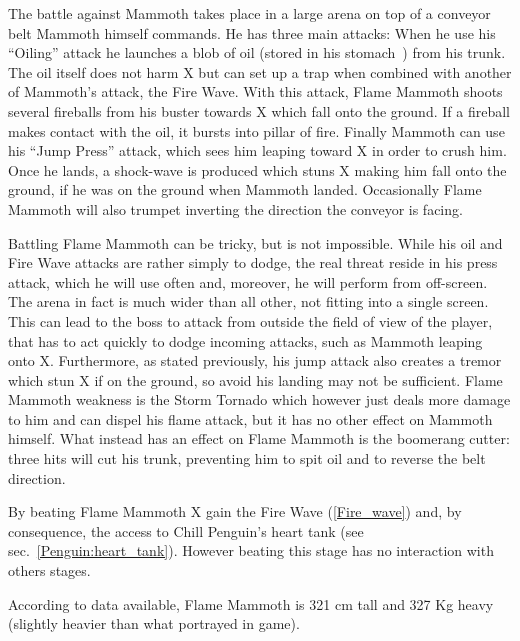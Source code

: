 The battle against Mammoth takes place in a large arena on top of a conveyor belt Mammoth himself commands. He has three main attacks: When he use his ``Oiling'' attack he launches a blob of oil (stored in his stomach~\cite{wayback:X_resources}) from his trunk. 
The oil itself does not harm X but can set up a trap when combined with another of Mammoth's attack, the Fire Wave. With this attack, Flame Mammoth shoots several fireballs from his buster towards X which fall onto the ground. If a fireball makes contact with the oil, it bursts into pillar of fire. Finally Mammoth can use his ``Jump Press'' attack, which sees him leaping toward X in order to crush him. Once he lands, a shock-wave is produced which stuns X making him fall onto the ground, if he was on the ground when Mammoth landed. Occasionally Flame Mammoth will also trumpet inverting the direction the conveyor is facing. 

Battling Flame Mammoth can be tricky, but is not impossible. While his oil and Fire Wave attacks are rather simply to dodge, the real threat reside in his press attack, which he will use often and, moreover, he will perform from off-screen. The arena in fact is much wider than all other, not fitting into a single screen. This can lead to the boss to attack from outside the field of view of the player, that has  to act quickly to dodge incoming attacks, such as Mammoth leaping onto X. Furthermore, as stated previously, his jump attack also creates a tremor which stun X if on the ground, so avoid his landing may not be sufficient. Flame Mammoth weakness is the Storm Tornado which however just deals more damage to him and can dispel his flame attack, but it has no other effect on Mammoth himself. What instead has an effect on Flame Mammoth is the boomerang cutter: three hits will cut his trunk, preventing him to spit oil and to reverse the belt direction.

By beating Flame Mammoth X gain the Fire Wave (\ref{Fire_wave}) and, by consequence, the access to Chill Penguin's heart tank (see sec.~\ref{Penguin:heart_tank}). However beating this stage has no interaction with others stages.

According to data available, Flame Mammoth is 321 cm tall and 327 Kg heavy (slightly heavier than what portrayed in game).

